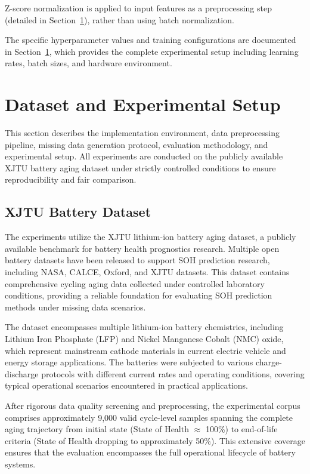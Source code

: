 \documentclass[5p,times]{elsarticle}
\begin{document}
Z-score normalization is applied to input features as a preprocessing step (detailed in Section~\ref{sec:dataset}), rather than using batch normalization.

The specific hyperparameter values and training configurations are documented in Section~\ref{sec:dataset}, which provides the complete experimental setup including learning rates, batch sizes, and hardware environment.

\section{Dataset and Experimental Setup}\label{sec:dataset}

This section describes the implementation environment, data preprocessing pipeline, missing data generation protocol, evaluation methodology, and experimental setup. All experiments are conducted on the publicly available XJTU battery aging dataset under strictly controlled conditions to ensure reproducibility and fair comparison.

\subsection{XJTU Battery Dataset}\label{sec:xjtu}

The experiments utilize the XJTU lithium-ion battery aging dataset\cite{wang2024open,duan2025lithium,wang2024pinn}, a publicly available benchmark for battery health prognostics research. Multiple open battery datasets have been released to support SOH prediction research, including NASA, CALCE, Oxford, and XJTU datasets\cite{severson2019data}. This dataset contains comprehensive cycling aging data collected under controlled laboratory conditions, providing a reliable foundation for evaluating SOH prediction methods under missing data scenarios.

The dataset encompasses multiple lithium-ion battery chemistries, including Lithium Iron Phosphate (LFP) and Nickel Manganese Cobalt (NMC) oxide, which represent mainstream cathode materials in current electric vehicle and energy storage applications. The batteries were subjected to various charge-discharge protocols with different current rates and operating conditions, covering typical operational scenarios encountered in practical applications.

After rigorous data quality screening and preprocessing, the experimental corpus comprises approximately 9,000 valid cycle-level samples spanning the complete aging trajectory from initial state (State of Health $\approx$ 100\%) to end-of-life criteria (State of Health dropping to approximately 50\%). This extensive coverage ensures that the evaluation encompasses the full operational lifecycle of battery systems.
\end{document}
